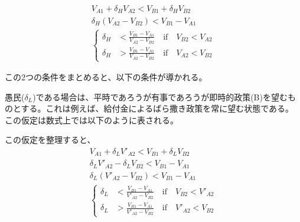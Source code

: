 \documentclass[main.tex]{subfiles}
\begin{document}
\noindent
\begin{align*}
  V_{A1} + \delta_H V_{A2} < V_{B1} + \delta_H V_{B2}\\
  \delta_H (V_{A2} - V_{B2}) < V_{B1}-V_{A1} \\
  \begin{cases}
    \delta_H &< \frac{V_{B1}-V_{A1}}{V_{A2} - V_{B2}} \quad\text{if}\quad V_{B2} < V_{A2}\\
    \delta_H &> \frac{V_{B1}-V_{A1}}{V_{A2} - V_{B2}} \quad\text{if}\quad V_{A2} < V_{B2}
  \end{cases}
\end{align*}


この2つの条件をまとめると、以下の条件が導かれる。

\bigskip
愚民($\delta_L$)である場合は、平時であろうが有事であろうが即時的政策(B)を望むものとする。これは例えば、給付金によるばら撒き政策を常に望む状態である。
この仮定は数式上では以下のように表される。
 
この仮定を整理すると、
\begin{align*}
  V_{A1} + \delta_L V'_{A2} < V_{B1} + \delta_L V_{B2} \\
  \delta_L V'_{A2} - \delta_L V_{B2} < V_{B1}  - V_{A1} \\
  \delta_L (V'_{A2} - V_{B2}) < V_{B1}  - V_{A1}\\
  \begin{cases}
    \delta_L &< \frac{V_{B1}-V_{A1}}{V'_{A2} - V_{B2}} \quad\text{if}\quad V_{B2} < V'_{A2} \\
    \delta_L &> \frac{V_{B1}-V_{A1}}{V'_{A2} - V_{B2}} \quad\text{if}\quad V'_{A2} < V_{B2}
  \end{cases}
\end{align*}
\end{document}
